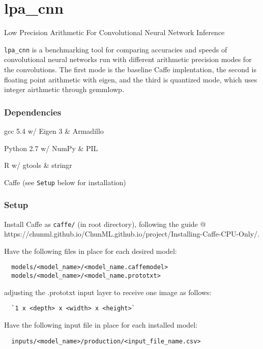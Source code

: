 \section{\texorpdfstring{\textbf{lpa\_cnn}}{lpa\_cnn}}\label{lpaux5fcnn}

Low Precision Arithmetic For Convolutional Neural Network Inference

\texttt{lpa\_cnn} is a benchmarking tool for comparing accuracies and
speeds of convolutional neural networks run with different arithmetic
precision modes for the convolutions. The first mode is the baseline
Caffe implentation, the second is floating point arithmetic with eigen,
and the third is quantized mode, which uses integer airthmetic through
gemmlowp.

\subsubsection{\texorpdfstring{\textbf{Dependencies}}{Dependencies}}\label{dependencies}

gcc 5.4 w/ Eigen 3 \& Armadillo

Python 2.7 w/ NumPy \& PIL

R w/ gtools \& stringr

Caffe (see \texttt{Setup} below for installation)

\subsubsection{\texorpdfstring{\textbf{Setup}}{Setup}}\label{setup}

Install Caffe as \texttt{caffe/} (in root directory), following the
guide @
https://chunml.github.io/ChunML.github.io/project/Installing-Caffe-CPU-Only/.

Have the following files in place for each desired model:

\begin{verbatim}
  models/<model_name>/<model_name.caffemodel>
  models/<model_name>/<model_name.prototxt>
\end{verbatim}

adjusting the .prototxt input layer to receive one image as follows:

\begin{verbatim}
  `1 x <depth> x <width> x <height>`
\end{verbatim}

Have the following input file in place for each installed model:

\begin{verbatim}
  inputs/<model_name>/production/<input_file_name.csv>
\end{verbatim}

